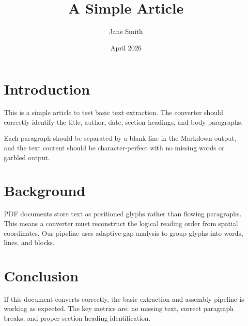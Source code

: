 \documentclass[12pt]{article}
\title{A Simple Article}
\author{Jane Smith}
\date{April 2026}
\begin{document}
\maketitle

\section{Introduction}
This is a simple article to test basic text extraction. The converter should
correctly identify the title, author, date, section headings, and body paragraphs.

Each paragraph should be separated by a blank line in the Markdown output, and
the text content should be character-perfect with no missing words or garbled output.

\section{Background}
PDF documents store text as positioned glyphs rather than flowing paragraphs.
This means a converter must reconstruct the logical reading order from spatial
coordinates. Our pipeline uses adaptive gap analysis to group glyphs into words,
lines, and blocks.

\section{Conclusion}
If this document converts correctly, the basic extraction and assembly pipeline
is working as expected. The key metrics are: no missing text, correct paragraph
breaks, and proper section heading identification.
\end{document}
